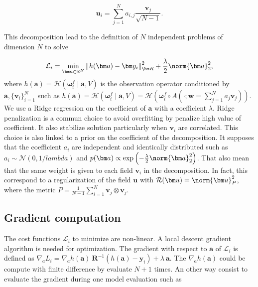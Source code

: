 \begin{equation*}
    \bm u_i =  \sum_{j = 1}^N a_{i,j} \frac{\bm v_j}{\sqrt{N - 1}}.
\end{equation*}

This decomposition lead to the definition of $N$ independent problems of dimension $N$ to solve

\begin{equation*}
    \mathcal L_i =  \min_{\bm a \in \mathbb R^N} \left\| h(\bm a) - \bm y_i\right\|_{\bm R}^2 + \frac{\lambda}{2} \norm{\bm a}^2_2,
\end{equation*}where  $h(\bm a) = \mathcal H(\bm \omega^f_i \mid \bm a,V)$ is the observation operator conditioned by $\bm a,\{\mathbf{v}_i\}_{i = 1}^N$ such as $h(\bm a) = \mathcal H(\bm \omega^f_i \mid \bm a,V) =\mathcal H(\bm \omega^f_i \circ A(\cdot; \bm w = \sum_{j = 1}^N a_{j} \bm v_j))$. We use a Ridge regression on the coefficient of $\bm a$ with a coefficient $\lambda$. Ridge penalization is a commun choice to avoid overfitting by penalize high value of coefficient. It also stabilize solution particularly when $\bm v_i$ are correlated. This choice is also linked to a prior on the coefficient of the decomposition. It supposes that the coefficient $a_i$ are independent and identically distributed such as $a_i \sim \mathcal N(0, 1/ lambda)$ and $p(\bm a) \propto \exp\left( - \frac{\lambda}{2} \norm{\bm a}_2^2\right)$. That also mean that the same weight is given to each field $\bm v_i$ in the decomposition. In fact, this correspond to a regularization of the field $\bm u$ with $\mathcal R(\bm u) = \norm{\bm u}^2_{P}$, where the metric $P = \frac{1}{N-1} \sum_{i = 1}^{N}\bm v_j \otimes \bm v_j$.

\subsection{Gradient computation}
The cost functions $\mathcal L_i$ to minimize are non-linear. A local descent gradient algorithm is needed for optimization. The gradient with respect to $\bm a$ of $\mathcal L_i$ is defined as $\nabla_a L_i = \nabla_a h(\bm a)~\bm R^{-1}(h(\bm a) - \bm y_i) + \lambda~\bm a$. The $\nabla_a h(\bm a)$ could be compute with finite difference by evaluate $N+1$ times. An other way consist to evaluate the gradient during one model evaluation such as



